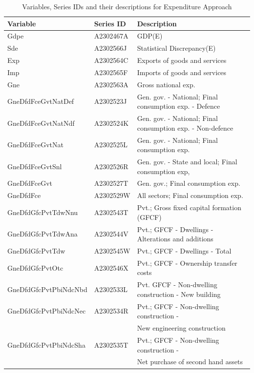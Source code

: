\documentclass[graybox]{svmult}
\begin{document}
\begin{table}[t]
	\caption{Variables, Series IDs and their descriptions for Expenditure Approach}
	\small
	\centering
		\begin{tabular*}{\columnwidth}[width = \textwidth]{lll}
			\toprule
			\textbf{Variable} & \textbf{Series ID} & \textbf{Description}\\
			\midrule
			
			Gdpe & A2302467A & GDP(E)\\
			Sde & A2302566J & Statistical Discrepancy(E)\\
			Exp & A2302564C & Exports of goods and services\\
			Imp & A2302565F & Imports of goods and services\\
			Gne & A2302563A & Gross national exp.\\
			\addlinespace
			GneDfdFceGvtNatDef & A2302523J & Gen. gov. - National; Final consumption exp. - Defence\\
			GneDfdFceGvtNatNdf & A2302524K & Gen. gov. - National; Final consumption exp. - Non-defence\\
			GneDfdFceGvtNat & A2302525L & Gen. gov. - National; Final consumption exp.\\
			GneDfdFceGvtSnl & A2302526R & Gen. gov. - State and local; Final consumption exp,\\
			GneDfdFceGvt & A2302527T & Gen. gov.; Final consumption exp.\\
			\addlinespace
			GneDfdFce & A2302529W & All sectors; Final consumption exp.\\
			GneDfdGfcPvtTdwNnu & A2302543T & Pvt.; Gross fixed capital formation (GFCF)\\
			GneDfdGfcPvtTdwAna & A2302544V & Pvt.; GFCF - Dwellings - Alterations and additions\\
			GneDfdGfcPvtTdw & A2302545W & Pvt.; GFCF - Dwellings - Total\\
			GneDfdGfcPvtOtc & A2302546X & Pvt.; GFCF - Ownership transfer costs\\
			\addlinespace
			GneDfdGfcPvtPbiNdcNbd & A2302533L & Pvt. GFCF - Non-dwelling construction - New building\\
			GneDfdGfcPvtPbiNdcNec & A2302534R & Pvt.; GFCF - Non-dwelling construction -\\
			&  & New engineering construction\\
			GneDfdGfcPvtPbiNdcSha & A2302535T & Pvt.; GFCF - Non-dwelling construction -\\
			&  & Net purchase of second hand \vphantom{1} assets\\

\end{tabular*}
\end{table}
\end{document}
